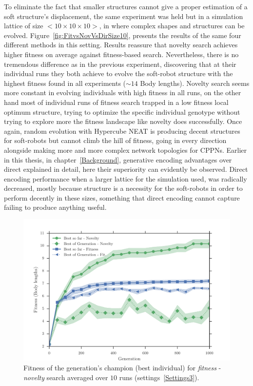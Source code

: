 To eliminate the fact that smaller structures cannot give a proper estimation of a soft structure's displacement, the same experiment was held but in a simulation lattice of size $<10 \times 10 \times 10>$, in where complex shapes and structures can be evolved. Figure~\ref{fig:FitvsNovVsDirSize10}, presents the results of the same four different methods in this setting. Results reassure that novelty search achieves higher fitness on average against fitness-based search. Nevertheless, there is no tremendous difference as in the previous experiment, discovering that at their individual runs they both achieve to evolve the soft-robot structure with the highest fitness found in all experiments ($\sim 14$ Body lengths). Novelty search seems more constant in evolving individuals with high fitness in all runs, on the other hand most of individual runs of fitness search trapped in a low fitness local optimum structure, trying to optimize the specific individual genotype without trying to explore more the fitness landscape like novelty does successfully. Once again, random evolution with Hypercube NEAT is producing decent structures for soft-robots but cannot climb the hill of fitness, going in every direction alongside making more and more complex network topologies for CPPNs. Earlier in this thesis, in chapter~\ref{Background}, generative encoding advantages over direct explained in detail, here their superiority can evidently be observed. Direct encoding performance when a larger lattice for the simulation used, was radically decreased, mostly because structure is a necessity for the soft-robots in order to perform decently in these sizes, something that direct encoding cannot capture failing to produce anything useful.






\begin{figure}[ht!]
\centering
\includegraphics[width=1.0\textwidth]{../Figures/Results/AvgGenerChampNoveltyFitnessSize7.pdf}
\caption{Fitness of the generation's champion (best individual) for \emph{fitness} - \emph{novelty} search averaged over $10$ runs (settings~\ref{Settings3}).}
\label{fig:AvgGenerChampNoveltyFitnessSize7}
\end{figure}

